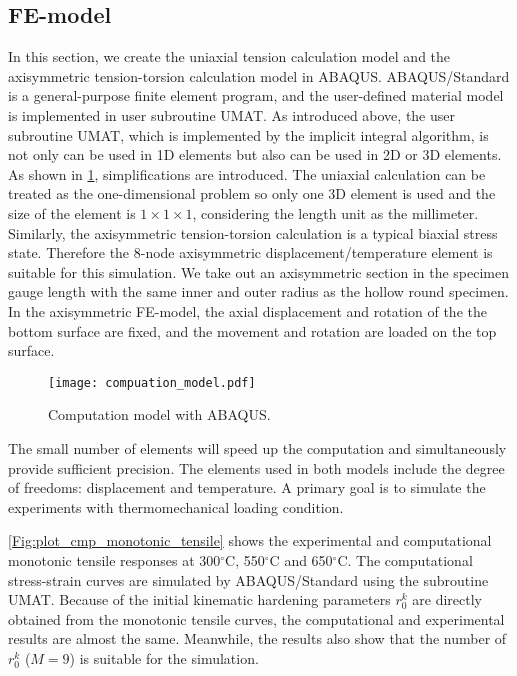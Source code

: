 \subsection{FE-model}
\noindent
In this section, we create the uniaxial tension calculation model and the axisymmetric tension-torsion calculation model in ABAQUS.
ABAQUS/Standard is a general-purpose finite element program, and the user-defined material model is implemented in user subroutine UMAT.
As introduced above, the user subroutine UMAT, which is implemented by the implicit integral algorithm, is not only can be used in 1D elements but also can be used in 2D or 3D elements.
As shown in \ref{Fig:Compuation_model}, simplifications are introduced.
The uniaxial calculation can be treated as the one-dimensional problem so only one 3D element is used and the size of the element is $1 \times 1 \times 1$, considering the length unit as the millimeter.
Similarly, the axisymmetric tension-torsion calculation is a typical biaxial stress state. Therefore the 8-node axisymmetric displacement/temperature element is suitable for this simulation.
We take out an axisymmetric section in the specimen gauge length with the same inner and outer radius as the hollow round specimen.
In the axisymmetric FE-model, the axial displacement and rotation of the the bottom surface are fixed, and the movement and rotation are loaded on the top surface.
\begin{figure}[!htp]
  \centering
  \texttt{[image: compuation\_model.pdf]}
  \caption{Computation model with ABAQUS.}
  \label{Fig:Compuation_model}
\end{figure}

The small number of elements will speed up the computation and simultaneously provide sufficient precision.
The elements used in both models include the degree of freedoms: displacement and temperature.
A primary goal is to simulate the experiments with thermomechanical loading condition.

\ref{Fig:plot_cmp_monotonic_tensile} shows the experimental and computational monotonic tensile responses at 300$^\circ$C, 550$^\circ$C and 650$^\circ$C.
The computational stress-strain curves are simulated by ABAQUS/Standard using the subroutine UMAT.
Because of the initial kinematic hardening parameters $r_0^k$ are directly obtained from the monotonic tensile curves, the computational and experimental results are almost the same. Meanwhile, the results also show that the number of $r_0^k$ ($M=9$) is suitable for the simulation.

